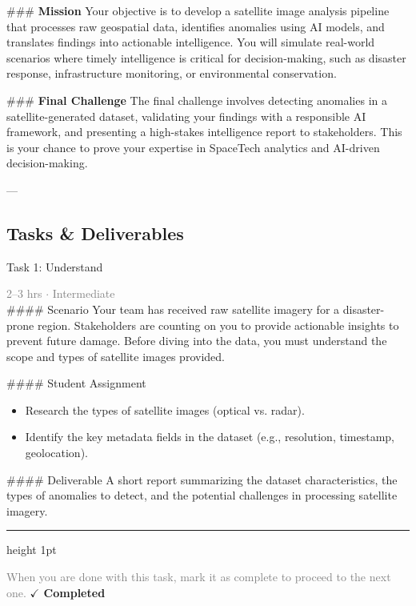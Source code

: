 \documentclass[10pt,a4paper]{article}
\begin{document}
\#\#\# \textbf{Mission}  
Your objective is to develop a satellite image analysis pipeline that processes raw geospatial data, identifies anomalies using AI models, and translates findings into actionable intelligence. You will simulate real-world scenarios where timely intelligence is critical for decision-making, such as disaster response, infrastructure monitoring, or environmental conservation.

\#\#\# \textbf{Final Challenge}  
The final challenge involves detecting anomalies in a satellite-generated dataset, validating your findings with a responsible AI framework, and presenting a high-stakes intelligence report to stakeholders. This is your chance to prove your expertise in SpaceTech analytics and AI-driven decision-making.

---

\subsection*{Tasks \& Deliverables}

\begin{taskbox}{Task 1: Understand}

    {\small \textcolor{gray}{2--3 hrs $\cdot$ Intermediate}}\\[12pt]

    \#\#\#\# Scenario  
Your team has received raw satellite imagery for a disaster-prone region. Stakeholders are counting on you to provide actionable insights to prevent future damage. Before diving into the data, you must understand the scope and types of satellite images provided.  

\#\#\#\# Student Assignment  
\begin{itemize}
    \item Research the types of satellite images (optical vs. radar).  
    \item Identify the key metadata fields in the dataset (e.g., resolution, timestamp, geolocation).  
\end{itemize}

\#\#\#\# Deliverable  
A short report summarizing the dataset characteristics, the types of anomalies to detect, and the potential challenges in processing satellite imagery.\par

    \vspace{16pt}

    \textcolor{cardBorder}{\hrule height 1pt}\vspace{8pt}

    \small \textcolor{gray}{When you are done with this task, mark it as complete to proceed to the next one.} \hfill \textbf{\textcolor{brandDark}{$\checkmark$ Completed}}

\end{taskbox}
\end{document}
